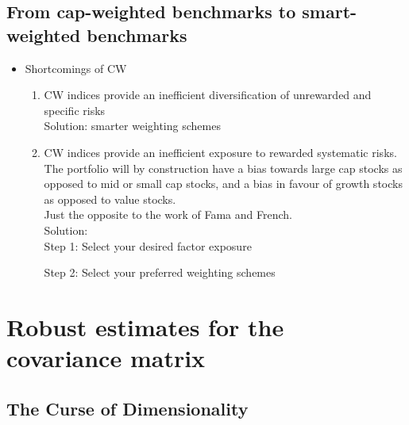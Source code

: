 \documentclass{maths}
\begin{document}
\subsection{From cap-weighted benchmarks to smart-weighted benchmarks}
\begin{itemize}
\item Shortcomings of CW
\begin{enumerate}

\item CW indices provide an inefficient diversification of unrewarded and specific risks\\

Solution: smarter weighting schemes\\

\item CW indices provide an inefficient exposure to rewarded systematic risks. The portfolio will by construction have a bias towards large cap stocks as opposed to mid or small cap stocks, and a bias in favour of growth stocks as opposed to value stocks.\\

Just the opposite to the work of Fama and French.\\

Solution:\\
Step 1: Select your desired factor exposure

Step 2: Select your preferred weighting schemes 
\end{enumerate}



\end{itemize}


\section{Robust estimates for the covariance matrix}
\subsection{The Curse of Dimensionality}
\end{document}
